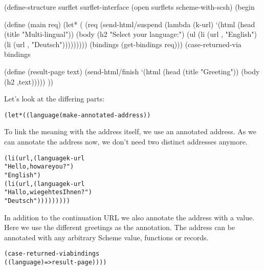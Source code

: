 \begin{listing}
(define-structure surflet surflet-interface
  (open surflets
        scheme-with-scsh)
  (begin
    
    (define (main req)
      (let* (
             (req (send-html/suspend
                   (lambda (k-url)
                     `(html 
                       (head (title "Multi-lingual"))
                       (body 
                        (h2 "Select your language:")
                        (ul
                         (li (url ,
                                  "English")
                         (li (url ,
                                  "Deutsch")))))))))
             (bindings (get-bindings req)))
        (case-returned-via bindings

    (define (result-page text)
      (send-html/finish
       `(html 
         (head (title "Greeting"))
         (body
          (h2 ,text)))))
    ))
\end{listing}

Let's look at the differing parts:

\begin{alltt}
      (let* ((language (make-annotated-address))
\end{alltt}

To link the meaning with the address itself, we use an annotated
address.  As we can annotate the address now, we don't need two
distinct addresses anymore.

\begin{alltt}
          (li (url ,(language k-url 
                              "Hello, how are you?")
                   "English")
          (li (url ,(language k-url 
                              "Hallo, wie geht es Ihnen?")
                   "Deutsch")))))))))
\end{alltt}

In addition to the continuation URL  we also annotate the
address with a value.  Here we use the different greetings as the
annotation.  The address can be annotated with any arbitrary Scheme
value, \eg functions or records.

\begin{alltt}
        (case-returned-via bindings
          ((language) => result-page))))
\end{alltt}

